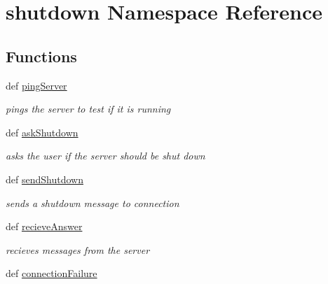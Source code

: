 \hypertarget{namespaceshutdown}{
\section{shutdown Namespace Reference}
\label{namespaceshutdown}
}
\subsection*{Functions}
\begin{DoxyCompactItemize}
\item 
def \hyperlink{namespaceshutdown_adf4fb042762c6903d3eb8ce90c713cdc}{pingServer}
\begin{DoxyCompactList}\small\item\em pings the server to test if it is running \item\end{DoxyCompactList}\item 
def \hyperlink{namespaceshutdown_a2313f265ce0f0849b164df60808b21a2}{askShutdown}
\begin{DoxyCompactList}\small\item\em asks the user if the server should be shut down \item\end{DoxyCompactList}\item 
def \hyperlink{namespaceshutdown_a9178e38304b9c410c317bd9086ef9b33}{sendShutdown}
\begin{DoxyCompactList}\small\item\em sends a shutdown message to connection \item\end{DoxyCompactList}\item 
def \hyperlink{namespaceshutdown_ad6883dd7a4f621dbf924bca76a71ce40}{recieveAnswer}
\begin{DoxyCompactList}\small\item\em recieves messages from the server \item\end{DoxyCompactList}\item 
def \hyperlink{namespaceshutdown_a5201484839af592727e8c0b7cf7be41e}{connectionFailure}
\end{DoxyCompactItemize}
